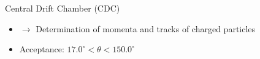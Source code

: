 \documentclass[8pt]{beamer}
\begin{document}
\begin{frame}{Central Drift Chamber (CDC)}
\begin{textblock*}{6.5cm}
\begin{itemize}
	
	
			\item[] $\rightarrow$ Determination of momenta and tracks of charged particles
			\item Acceptance: $17.0^{\circ} < \theta < 150.0^{\circ}$ 
		\end{itemize}

	\end{textblock*}














\end{frame}
\end{document}
